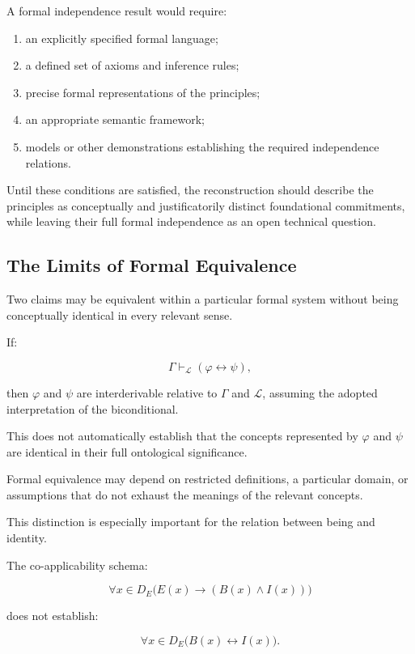 A formal independence result would require:

\begin{enumerate}
    \item an explicitly specified formal language;
    \item a defined set of axioms and inference rules;
    \item precise formal representations of the principles;
    \item an appropriate semantic framework;
    \item models or other demonstrations establishing
    the required independence relations.
\end{enumerate}

Until these conditions are satisfied, the reconstruction
should describe the principles as conceptually and
justificatorily distinct foundational commitments, while
leaving their full formal independence as an open technical
question.

\subsection{The Limits of Formal Equivalence}

Two claims may be equivalent within a particular formal
system without being conceptually identical in every
relevant sense.

If:

\[
    \Gamma \vdash_{\mathcal{L}} (\varphi \leftrightarrow \psi),
\]

then \(\varphi\) and \(\psi\) are interderivable relative
to \(\Gamma\) and \(\mathcal{L}\), assuming the adopted
interpretation of the biconditional.

This does not automatically establish that the concepts
represented by \(\varphi\) and \(\psi\) are identical in
their full ontological significance.

Formal equivalence may depend on restricted definitions,
a particular domain, or assumptions that do not exhaust
the meanings of the relevant concepts.

This distinction is especially important for the relation
between being and identity.

The co-applicability schema:

\[
    \forall x \in D_E
    \bigl(E(x) \rightarrow (B(x) \land I(x))\bigr)
\]

does not establish:

\[
    \forall x \in D_E
    \bigl(B(x) \leftrightarrow I(x)\bigr).
\]

